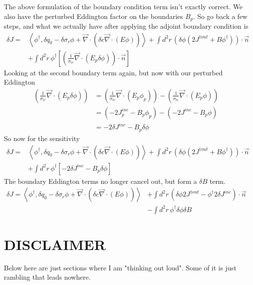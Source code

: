 \documentclass{article}
\newcommand{\bra}{\left\langle}
\newcommand{\ket}{\right\rangle}
\newcommand{\vdiv}{\vec{\nabla} \cdot}
\begin{document}
The above formulation of the boundary condition term isn't exactly correct. We also have the perturbed Eddington factor on the boundaries $B_p$. So go back a few steps, and what we actually have after applying the adjoint boundary condition is 
\begin{align*}
\delta J =& \bra \phi^\dag , \delta q_0 - \delta \sigma_r \phi + \vdiv \left( \delta c \vdiv \left( E \phi \right) \right)  \ket + \int d^2 r \, \left(\delta \phi \left( 2J^{ \dag out } + B \phi^\dag \right) \right) \cdot \vec{n} \\
&+ \int d^2 r \, \phi^\dag \left[ \left( \frac{1}{\sigma_{tr}} \vdiv \left( E_p \delta \phi \right) \right) \cdot \vec{n} \right]
\end{align*} 
Looking at the second boundary term again, but now with our perturbed Eddington
\begin{align*}
\left( \frac{1}{\sigma_{tr}} \vdiv \left( E_p \delta \phi \right) \right) 
& = \left( \frac{1}{\sigma_{tr}} \vdiv \left( E_p \phi_p \right) \right) - \left( \frac{1}{\sigma_{tr}} \vdiv \left( E_p \phi \right) \right) \\
&= (-2J_p^{inc} - B_p \phi_p) - (-2J^{inc} - B_p \phi) \\
&= -2\delta J^{inc} -B_p \delta \phi
\end{align*}
So now for the sensitivity
\begin{align*}
\delta J =& \bra \phi^\dag , \delta q_0 - \delta \sigma_r \phi + \vdiv \left( \delta c \vdiv \left( E \phi \right) \right)  \ket + \int d^2 r \, \left(\delta \phi \left( 2J^{ \dag out } + B \phi^\dag \right) \right) \cdot \vec{n} \\
&+ \int d^2 r \, \phi^\dag \left[ -2\delta J^{inc} -B_p \delta \phi \right]
\end{align*}
The boundary Eddington terms no longer cancel out, but form a $\delta B$ term.
\begin{align*}
\delta J = \bra \phi^\dag , \delta q_0 - \delta \sigma_r \phi + \vdiv \left( \delta c \vdiv \left( E \phi \right) \right)  \ket &+ \int d^2 r \, \left(  \delta \phi 2J^{ \dag out }  - \phi^\dag 2\delta J^{inc} \right) \cdot \vec{n} \\ 
&- \int d^2 r \, \phi^\dag \delta \phi \delta B
\end{align*}

\section*{DISCLAIMER}
Below here are just sections where I am "thinking out loud". Some of it is just rambling that leads nowhere.
\end{document}
